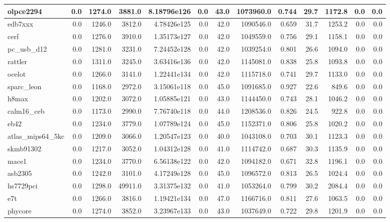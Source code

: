 \begin{tabular}{|l r r r r| r r r r r r | r r|}
\hline
olpce2294 & 0.0 & 1274.0 & 3881.0 & 8.18796e126 & 0.0 & 43.0 & 1073960.0 & 0.744 & 29.7 & 1172.8 & 0.0 & 0.0 \\
\hline
edb7xxx & 0.0 & 1246.0 & 3812.0 & 4.78426e125 & 0.0 & 42.0 & 1090546.0 & 0.659 & 31.7 & 1253.2 & 0.0 & 0.0 \\
\hline
cerf & 0.0 & 1276.0 & 3910.0 & 1.35173e127 & 0.0 & 42.0 & 1049559.0 & 0.756 & 29.1 & 1158.1 & 0.0 & 0.0 \\
\hline
pc\_usb\_d12 & 0.0 & 1281.0 & 3231.0 & 7.24452e128 & 0.0 & 42.0 & 1039254.0 & 0.801 & 26.6 & 1094.0 & 0.0 & 0.0 \\
\hline
rattler & 0.0 & 1311.0 & 3245.0 & 3.63416e136 & 0.0 & 42.0 & 1145081.0 & 0.838 & 25.8 & 1093.8 & 0.0 & 0.0 \\
\hline
ocelot & 0.0 & 1266.0 & 3141.0 & 1.22441e134 & 0.0 & 42.0 & 1115718.0 & 0.741 & 29.7 & 1133.0 & 0.0 & 0.0 \\
\hline
sparc\_leon & 0.0 & 1168.0 & 2972.0 & 3.15061e118 & 0.0 & 45.0 & 1091685.0 & 0.927 & 22.6 & 849.6 & 0.0 & 0.0 \\
\hline
h8max & 0.0 & 1202.0 & 3072.0 & 1.05885e121 & 0.0 & 43.0 & 1144450.0 & 0.743 & 28.1 & 1046.2 & 0.0 & 0.0 \\
\hline
calm16\_ceb & 0.0 & 1173.0 & 2990.0 & 7.76740e118 & 0.0 & 44.0 & 1208536.0 & 0.826 & 24.5 & 922.8 & 0.0 & 0.0 \\
\hline
eb42 & 0.0 & 1234.0 & 3779.0 & 1.07789e124 & 0.0 & 45.0 & 1152371.0 & 0.806 & 25.8 & 1020.2 & 0.0 & 0.0 \\
\hline
atlas\_mips64\_5kc & 0.0 & 1209.0 & 3066.0 & 1.20547e123 & 0.0 & 40.0 & 1043108.0 & 0.703 & 30.1 & 1123.3 & 0.0 & 0.0 \\
\hline
skmb91302 & 0.0 & 1217.0 & 3052.0 & 1.04312e128 & 0.0 & 41.0 & 1114742.0 & 0.687 & 30.3 & 1135.9 & 0.0 & 0.0 \\
\hline
mace1 & 0.0 & 1234.0 & 3770.0 & 6.56138e122 & 0.0 & 42.0 & 1094182.0 & 0.671 & 32.8 & 1196.1 & 0.0 & 0.0 \\
\hline
asb2305 & 0.0 & 1242.0 & 3101.0 & 4.17249e128 & 0.0 & 45.0 & 1096572.0 & 0.813 & 26.5 & 1024.4 & 0.0 & 0.0 \\
\hline
hs7729pci & 0.0 & 1298.0 & 49911.0 & 3.31375e132 & 0.0 & 41.0 & 1053264.0 & 0.799 & 30.2 & 2084.4 & 0.0 & 0.0 \\
\hline
e7t & 0.0 & 1266.0 & 3816.0 & 1.19421e134 & 0.0 & 47.0 & 1166716.0 & 0.811 & 27.6 & 1063.5 & 0.0 & 0.0 \\
\hline
phycore & 0.0 & 1274.0 & 3852.0 & 3.23967e133 & 0.0 & 43.0 & 1037649.0 & 0.722 & 29.8 & 1201.9 & 0.0 & 0.0 \\

\end{tabular}
